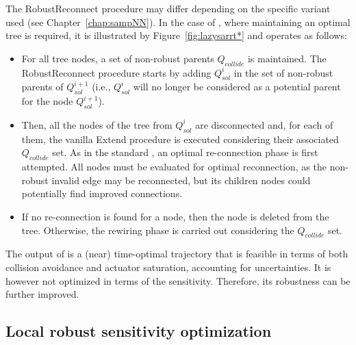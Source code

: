 The RobustReconnect procedure may differ depending on the specific  variant used (see Chapter~\ref{chap:sampNN}). 
In the case of , where maintaining an optimal tree is required, it is illustrated by Figure~\ref{fig:lazysarrt*} and operates as follows:
\begin{itemize}
    \item For all tree nodes, a set of non-robust parents $Q_{collide}$ is maintained. 
    The RobustReconnect procedure starts by adding $Q_{sol}^i$ in the set of non-robust parents of $Q_{sol}^{i+1}$ (i.e., $Q_{sol}^i$ will no longer be considered as a potential parent for the node $Q_{sol}^{i+1}$).
    \item Then, all the nodes of the tree from $Q_{sol}^i$ are disconnected and, for each of them, the vanilla Extend procedure is executed considering their associated $Q_{collide}$ set.
    As in the standard , an optimal re-connection phase is first attempted.
    All nodes must be evaluated for optimal reconnection, as the non-robust invalid edge may be reconnected, but its children nodes could potentially find improved connections.
    \item If no re-connection is found for a node, then the node is deleted from the tree. 
    Otherwise, the rewiring phase is carried out considering the $Q_{collide}$ set.
\end{itemize}

The output of  is a (near) time-optimal trajectory that is feasible in terms of both collision avoidance and actuator saturation, accounting for uncertainties.
It is however not optimized in terms of the sensitivity. 
Therefore, its robustness can be further improved.

\subsection{Local robust sensitivity optimization}

